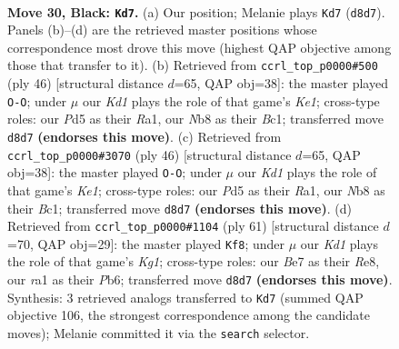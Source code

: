 \documentclass[11pt]{article}
\begin{document}
\clearpage

\begin{figure}[p]\centering
\begin{subfigure}{0.46\textwidth}\centering
\resizebox{\linewidth}{!}{%
\newchessgame
\chessboard[
  setfen={rn1k2r1/1p2bb1p/6pP/p2pPp2/P2N4/6P1/1B5K/RN3R2 b - - 4 30},
  showmover=false,
  pgfstyle=straightmove, color=movearrow, markmove={d8-d7}
]}
\caption{}
\end{subfigure}\hfill
\begin{subfigure}{0.46\textwidth}\centering
\resizebox{\linewidth}{!}{%
\newchessgame
\chessboard[
  setfen={r3k2r/1b3p2/1p6/4p1Pp/3nP2P/8/PP6/R1BBK2R w KQkq - 1 24},
  showmover=false,
  pgfstyle=straightmove, color=movearrow, markmove={e1-g1}
]}
\caption{}
\end{subfigure}
\\[4pt]
\begin{subfigure}{0.46\textwidth}\centering
\resizebox{\linewidth}{!}{%
\newchessgame
\chessboard[
  setfen={r3k2r/1b3p2/1p6/4p1Pp/3nP2P/8/PP6/R1BBK2R w KQkq - 1 24},
  showmover=false,
  pgfstyle=straightmove, color=movearrow, markmove={e1-g1}
]}
\caption{}
\end{subfigure}\hfill
\begin{subfigure}{0.46\textwidth}\centering
\resizebox{\linewidth}{!}{%
\newchessgame
\chessboard[
  setfen={4r1k1/p6p/1pb2rp1/8/1PP1p3/2N1R2P/P5P1/3R2K1 b - - 1 31},
  showmover=false,
  pgfstyle=straightmove, color=movearrow, markmove={g8-f8}
]}
\caption{}
\end{subfigure}
\caption{\textbf{Move 30, Black: \texttt{Kd7}.} (a) Our position; Melanie plays \texttt{Kd7} (\texttt{d8d7}). Panels (b)--(d) are the retrieved master positions whose correspondence most drove this move (highest QAP objective among those that transfer to it). (b) Retrieved from \texttt{ccrl\_top\_p0000\#500} (ply 46) [structural distance $d$=65, QAP obj=38]: the master played \texttt{O-O}; under $\mu$ our \emph{Kd1} plays the role of that game's \emph{Ke1}; cross-type roles: our \emph{P}d5 as their \emph{R}a1, our \emph{N}b8 as their \emph{B}c1; transferred move \texttt{d8d7} \textbf{(endorses this move)}. (c) Retrieved from \texttt{ccrl\_top\_p0000\#3070} (ply 46) [structural distance $d$=65, QAP obj=38]: the master played \texttt{O-O}; under $\mu$ our \emph{Kd1} plays the role of that game's \emph{Ke1}; cross-type roles: our \emph{P}d5 as their \emph{R}a1, our \emph{N}b8 as their \emph{B}c1; transferred move \texttt{d8d7} \textbf{(endorses this move)}. (d) Retrieved from \texttt{ccrl\_top\_p0000\#1104} (ply 61) [structural distance $d$=70, QAP obj=29]: the master played \texttt{Kf8}; under $\mu$ our \emph{Kd1} plays the role of that game's \emph{Kg1}; cross-type roles: our \emph{B}e7 as their \emph{R}e8, our \emph{r}a1 as their \emph{P}b6; transferred move \texttt{d8d7} \textbf{(endorses this move)}. Synthesis: 3 retrieved analogs transferred to \texttt{Kd7} (summed QAP objective 106, the strongest correspondence among the candidate moves); Melanie committed it via the \texttt{search} selector.}
\label{fig:thought-m59}
\end{figure}
\end{document}
